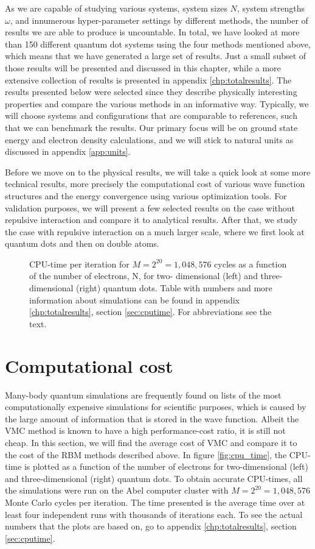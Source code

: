 As we are capable of studying various systems, system sizes $N$, system strengths $\omega$, and innumerous hyper-parameter settings by different methods, the number of results we are able to produce is uncountable. In total, we have looked at more than 150 different quantum dot systems using the four methods mentioned above, which means that we have generated a large set of results. Just a small subset of those results will be presented and discussed in this chapter, while a more extensive collection of results is presented in appendix \ref{chp:totalresults}. The results presented below were selected since they describe physically interesting properties and compare the various methods in an informative way. Typically, we will choose systems and configurations that are comparable to references, such that we can benchmark the results. Our primary focus will be on ground state energy and electron density calculations, and we will stick to natural units as discussed in appendix \ref{app:units}.

Before we move on to the physical results, we will take a quick look at some more technical results, more precisely the computational cost of various wave function structures and the energy convergence using various optimization tools. For validation purposes, we will present a few selected results on the case without repulsive interaction and compare it to analytical results. After that, we study the case with repulsive interaction on a much larger scale, where we first look at quantum dots and then on double atoms.

\begin{figure}
	\centering 
	
	\caption{CPU-time per iteration for $M=2^{20}=1,048,576$ cycles as a function of the number of electrons, N, for two- dimensional (left) and three-dimensional (right) quantum dots. Table with numbers and more information about simulations can be found in appendix \ref{chp:totalresults}, section \ref{sec:cputime}. For abbreviations see the text.}
	\label{fig:cpu_time}
\end{figure} 

\section{Computational cost}
Many-body quantum simulations are frequently found on lists of the most computationally expensive simulations for scientific purposes, which is caused by the large amount of information that is stored in the wave function. Albeit the VMC method is known to have a high performance-cost ratio, it is still not cheap. In this section, we will find the average cost of VMC and compare it to the cost of the RBM methods described above. In figure \eqref{fig:cpu_time}, the CPU-time is plotted as a function of the number of electrons for two-dimensional (left) and three-dimensional (right) quantum dots. To obtain accurate CPU-times, all the simulations were run on the Abel computer cluster with $M=2^{20}=1,048,576$ Monte Carlo cycles per iteration. The time presented is the average time over at least four independent runs with thousands of iterations each. To see the actual numbers that the plots are based on, go to appendix \ref{chp:totalresults}, section \ref{sec:cputime}. 


